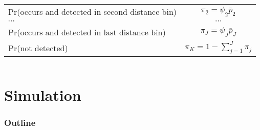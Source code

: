 \documentclass[color=usenames,dvipsnames]{beamer}\usepackage[]{graphicx}\usepackage[]{color}
\begin{document}
\begin{frame}
\begin{columns}
\begin{tabular}{lc}
      Pr(occurs and detected in second distance bin)  & $\pi_2 = \psi_2\bar{p}_2$   \\
      {\centering $\cdots$}             & $\cdots$                     \\
      Pr(occurs and detected in last distance bin)  & $\pi_J = \psi_J\bar{p}_J$   \\
      Pr(not detected)                  & $\pi_{K} = 1-\sum_{j=1}^J \pi_j$          \\
      \hline
    \end{tabular}
  \end{columns}
\end{frame}








\section{Simulation}



\begin{frame}
  \frametitle{Outline}
  \Large
  \tableofcontents[currentsection]
\end{frame}
\end{document}
